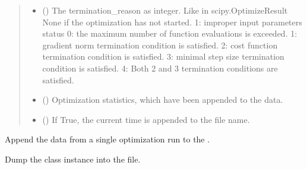 \documentclass[letterpaper,10pt,english]{sphinxmanual}
\begin{document}
\begin{fulllineitems}
\begin{quote}
\begin{description}
\begin{itemize}
\item {} 
 () \textendash{} The termination\_reason as integer. Like in scipy.OptimizeResult
None if the optimization has not started.
\sphinxhyphen{}1: improper input parameters status
0: the maximum number of function evaluations is exceeded.
1: gradient norm termination condition is satisfied.
2: cost function termination condition is satisfied.
3: minimal step size termination condition is satisfied.
4: Both 2 and 3 termination conditions are satisfied.

\item {} 
 () \textendash{} Optimization statistics, which have been appended to the data.

\item {} 
 () \textendash{} If True, the current time is appended to the file name.

\end{itemize}

\end{description}\end{quote}

\begin{fulllineitems}
\label{\detokenize{qsim:qsim.data_container.DataContainer.append_optim_result}}
Append the data from a single optimization run to the .

\end{fulllineitems}


\begin{fulllineitems}
\label{\detokenize{qsim:qsim.data_container.DataContainer.to_pickle}}
Dump the class instance into the file.


\end{fulllineitems}
\end{fulllineitems}
\end{document}
